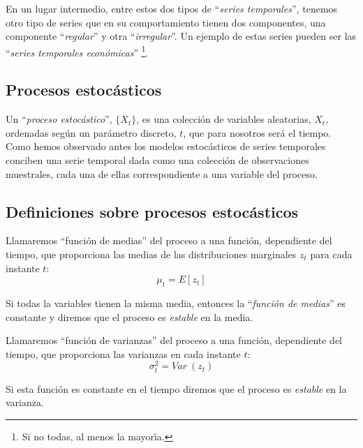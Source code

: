 En un lugar intermedio, entre estos dos tipos de ``\emph{series temporales}'',
tenemos otro tipo de series que en su comportamiento tienen dos componentes,
una componente ``\emph{regular}'' y otra ``\emph{irregular}''. Un ejemplo de 
estas series pueden ser las ``\emph{series temporales econ\'omicas}''%
\footnote{Si no todas, al menos la mayor\'{\i}a.}.

\subsection{Procesos estoc\'asticos}

Un ``\emph{proceso estoc\'astico}'', $\{X_t\}$, es una colecci\'on de variables
aleatorias, $X_t$, ordenadas seg\'un un par\'ametro discreto, $t$, que para 
nosotros ser\'a el tiempo.\\

Como hemos observado antes los modelos estoc\'asticos de series temporales
conciben una serie temporal dada como una colecci\'on de observaciones
muestrales, cada una de ellas correspondiente a una variable del proceso.

\subsection{Definiciones sobre procesos estoc\'asticos}

\begin{definicion}\label{def:funciondemedias}
Llamaremos ``funci\'on de medias'' del proceso a una funci\'on, dependiente del
tiempo, que proporciona las medias de las distribuciones marginales $z_t$ para
cada instante $t$:
\begin{displaymath}
\mu_t = E[z_t]
\end{displaymath}
\end{definicion}
Si todas la variables tienen la misma media, entonces la ``\emph{funci\'on de
medias}'' es constante y diremos que el proceso es \emph{estable} en la media.

\begin{definicion}\label{def:funciondevarianzas}
Llamaremos ``funci\'on de varianzas'' del proceso a una funci\'on, dependiente
del tiempo, que proporciona las varianzas en cada instante $t$:
\begin{displaymath}
\sigma^2_t = Var\ (z_t)
\end{displaymath}
\end{definicion}
Si esta funci\'on es constante en el tiempo diremos que el proceso es
\emph{estable} en la varianza.


